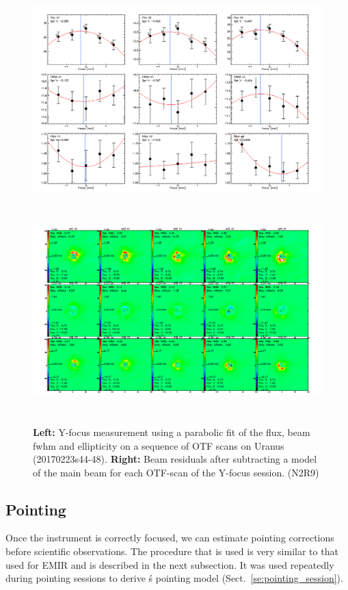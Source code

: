 \begin{figure}[h!]
\centering
\includegraphics[height=8cm]{Figures/plot_20170223s44.png}
\hspace{0.5cm}
\includegraphics[height=8cm]{Figures/residuals_focus_otf_20170223s44.png}
\caption[Lateral Y focus measures]{\textbf{Left:} Y-focus measurement using a
    parabolic fit of the flux, beam fwhm and ellipticity on a sequence
    of OTF scans on Uranus (20170223s44-48). \textbf{Right:} Beam residuals
    after subtracting a model of the main beam for each OTF-scan of the Y-focus
    session. (N2R9)}
\label{fig:Y_focus}
\end{figure}

\subsection{Pointing}
\label{se:pointing}

Once the instrument is correctly focused, we can estimate pointing corrections
before scientific observations. The procedure that is used is very similar to
that used for EMIR and is described in the next subsection. It was used
repeatedly during pointing sessions to derive \nika\'s pointing model
(Sect.~\ref{se:pointing_session}).

